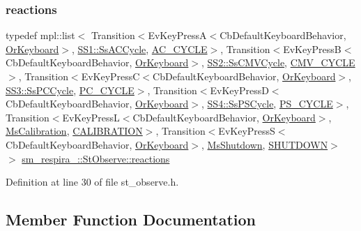 \subsubsection{\texorpdfstring{reactions}{reactions}}
{\footnotesize\ttfamily typedef mpl\+::list$<$ Transition$<$Ev\+Key\+PressA$<$Cb\+Default\+Keyboard\+Behavior, \hyperlink{classsm__respira__1_1_1OrKeyboard}{Or\+Keyboard}$>$, \hyperlink{structsm__respira__1_1_1SS1_1_1SsACCycle}{S\+S1\+::\+Ss\+A\+C\+Cycle}, \hyperlink{structsm__respira__1_1_1StObserve_1_1AC__CYCLE}{A\+C\+\_\+\+C\+Y\+C\+LE}$>$, Transition$<$Ev\+Key\+PressB$<$Cb\+Default\+Keyboard\+Behavior, \hyperlink{classsm__respira__1_1_1OrKeyboard}{Or\+Keyboard}$>$, \hyperlink{structsm__respira__1_1_1SS2_1_1SsCMVCycle}{S\+S2\+::\+Ss\+C\+M\+V\+Cycle}, \hyperlink{structsm__respira__1_1_1StObserve_1_1CMV__CYCLE}{C\+M\+V\+\_\+\+C\+Y\+C\+LE}$>$, Transition$<$Ev\+Key\+PressC$<$Cb\+Default\+Keyboard\+Behavior, \hyperlink{classsm__respira__1_1_1OrKeyboard}{Or\+Keyboard}$>$, \hyperlink{structsm__respira__1_1_1SS3_1_1SsPCCycle}{S\+S3\+::\+Ss\+P\+C\+Cycle}, \hyperlink{structsm__respira__1_1_1StObserve_1_1PC__CYCLE}{P\+C\+\_\+\+C\+Y\+C\+LE}$>$, Transition$<$Ev\+Key\+PressD$<$Cb\+Default\+Keyboard\+Behavior, \hyperlink{classsm__respira__1_1_1OrKeyboard}{Or\+Keyboard}$>$, \hyperlink{structsm__respira__1_1_1SS4_1_1SsPSCycle}{S\+S4\+::\+Ss\+P\+S\+Cycle}, \hyperlink{structsm__respira__1_1_1StObserve_1_1PS__CYCLE}{P\+S\+\_\+\+C\+Y\+C\+LE}$>$, Transition$<$Ev\+Key\+PressL$<$Cb\+Default\+Keyboard\+Behavior, \hyperlink{classsm__respira__1_1_1OrKeyboard}{Or\+Keyboard}$>$, \hyperlink{classsm__respira__1_1_1MsCalibration}{Ms\+Calibration}, \hyperlink{structsm__respira__1_1_1StObserve_1_1CALIBRATION}{C\+A\+L\+I\+B\+R\+A\+T\+I\+ON}$>$, Transition$<$Ev\+Key\+PressS$<$Cb\+Default\+Keyboard\+Behavior, \hyperlink{classsm__respira__1_1_1OrKeyboard}{Or\+Keyboard}$>$, \hyperlink{classsm__respira__1_1_1MsShutdown}{Ms\+Shutdown}, \hyperlink{structsm__respira__1_1_1StObserve_1_1SHUTDOWN}{S\+H\+U\+T\+D\+O\+WN}$>$ $>$ \hyperlink{structsm__respira__1_1_1StObserve_a00306e36ae7345cee5a35abc4c88d9c5}{sm\+\_\+respira\+\_\+::\+St\+Observe\+::reactions}}



Definition at line 30 of file st\+\_\+observe.\+h.



\subsection{Member Function Documentation}
\mbox{\label{structsm__respira__1_1_1StObserve_a4aa08a7d0471453573d7ad4f4d6797ed}} 
